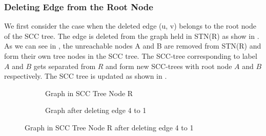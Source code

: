 \subsubsection{Deleting Edge from the Root Node}\label{Subsubsec: Deleting Edge from the Root Node}

We first consider the case when the deleted edge (u, v) belongs to the root node of the SCC tree.
The edge is deleted from the graph held in \textsc{STN}(R) as show in \figureref{\ref{fig:tree_node_r_graph_after_dedge1}}.
As we can see in \figureref{\ref{fig:graph_after_dedge_4_to_1}}, the unreachable nodes A and B are removed from \textsc{STN}(R)
and form their own tree nodes in the SCC tree. The SCC-tree corresponding to label $A$ and $B$ gets separated from $R$ and form 
new SCC-trees with root node $A$ and $B$ respectively. The SCC tree is updated as shown in \figureref{\ref{fig:scc_tree_graph_after_del}}.

\begin{figure}[H]
    \centering
    \begin{subfigure}{0.45\textwidth}
        \centering
        \caption{Graph in SCC Tree Node R}
        \label{fig:tree_node_r_graph}
    \end{subfigure}
    \hfill
    \begin{subfigure}{0.45\textwidth}
        \centering
        \caption{Graph after deleting edge 4 to 1}
        \label{fig:graph_after_dedge_4_to_1}
    \end{subfigure}
    \caption{Graph in SCC Tree Node R after deleting edge 4 to 1}
    \label{fig:tree_node_r_graph_after_dedge1}
\end{figure}


